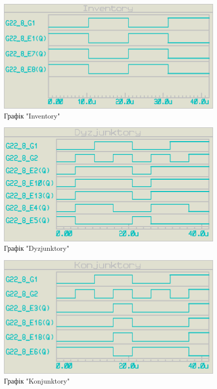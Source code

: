 \documentclass{article}
\begin{document}
\begin{normalsize}
	\begin{figure}[H]
		\centering
		\includegraphics[scale=0.57]{g1}
		\caption{Графік "Inventory"}
	\end{figure}
	\begin{figure}[H]
		\centering
		\includegraphics[scale=0.57]{g2}
		\caption{Графік "Dyzjunktory"}
	\end{figure}
	\begin{figure}[H]
		\centering
		\includegraphics[scale=0.57]{g3}
		\caption{Графік "Konjunktory"}
	\end{figure}


\end{normalsize}
\end{document}
